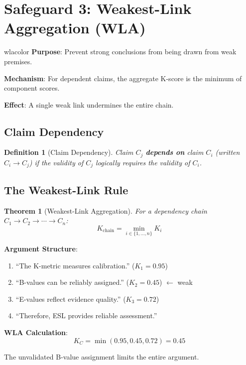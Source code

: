 \documentclass[11pt,a4paper]{article}
\newtheorem{definition}{Definition}[section]
\newtheorem{theorem}{Theorem}[section]
\theoremstyle{remark}
\begin{document}

\section{Safeguard 3: Weakest-Link Aggregation (WLA)}
\label{sec:wla}

\begin{safeguardbox}{wlacolor}
\textbf{Purpose}: Prevent strong conclusions from being drawn from weak premises.

\textbf{Mechanism}: For dependent claims, the aggregate K-score is the minimum of component scores.

\textbf{Effect}: A single weak link undermines the entire chain.
\end{safeguardbox}

\subsection{Claim Dependency}

\begin{definition}[Claim Dependency]
\label{def:dependency}
Claim $C_j$ \textbf{depends on} claim $C_i$ (written $C_i \to C_j$) if the validity of $C_j$ logically requires the validity of $C_i$.
\end{definition}

\subsection{The Weakest-Link Rule}

\begin{theorem}[Weakest-Link Aggregation]
\label{thm:wla}
For a dependency chain $C_1 \to C_2 \to \cdots \to C_n$:
\begin{equation}
K_{\text{chain}} = \min_{i \in \{1, \ldots, n\}} K_i
\end{equation}
\end{theorem}

\begin{examplebox}[title={Weakest-Link Example}]
\textbf{Argument Structure}:
\begin{enumerate}
    \item[P1.] ``The K-metric measures calibration.'' ($K_1 = 0.95$)
    \item[P2.] ``B-values can be reliably assigned.'' ($K_2 = 0.45$) $\leftarrow$ weak
    \item[P3.] ``E-values reflect evidence quality.'' ($K_3 = 0.72$)
    \item[C.] ``Therefore, ESL provides reliable assessment.''
\end{enumerate}

\textbf{WLA Calculation}:
\begin{equation}
K_C = \min(0.95, 0.45, 0.72) = 0.45
\end{equation}

The unvalidated B-value assignment limits the entire argument.
\end{examplebox}
\end{document}

